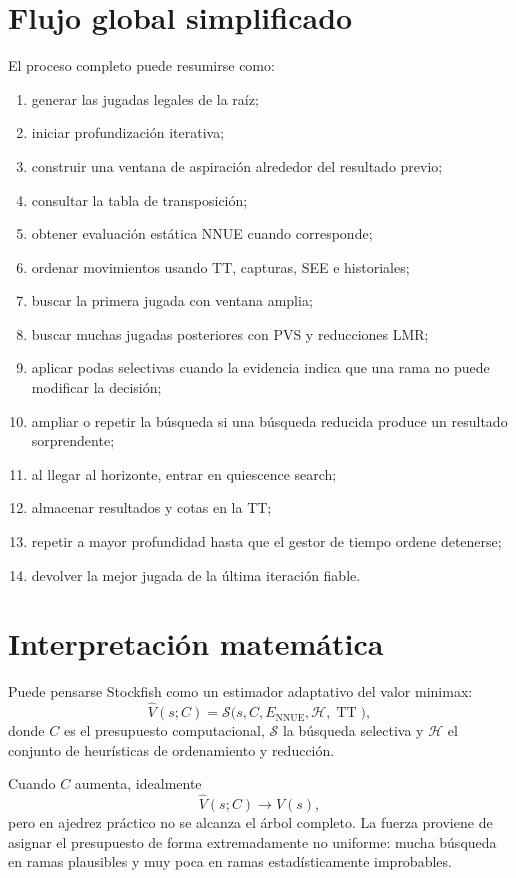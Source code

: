 \documentclass[11pt,a4paper]{article}
\begin{document}
\section{Flujo global simplificado}

El proceso completo puede resumirse como:
\begin{enumerate}
    \item generar las jugadas legales de la raíz;
    \item iniciar profundización iterativa;
    \item construir una ventana de aspiración alrededor del resultado previo;
    \item consultar la tabla de transposición;
    \item obtener evaluación estática NNUE cuando corresponde;
    \item ordenar movimientos usando TT, capturas, SEE e historiales;
    \item buscar la primera jugada con ventana amplia;
    \item buscar muchas jugadas posteriores con PVS y reducciones LMR;
    \item aplicar podas selectivas cuando la evidencia indica que una rama no puede modificar la decisión;
    \item ampliar o repetir la búsqueda si una búsqueda reducida produce un resultado sorprendente;
    \item al llegar al horizonte, entrar en quiescence search;
    \item almacenar resultados y cotas en la TT;
    \item repetir a mayor profundidad hasta que el gestor de tiempo ordene detenerse;
    \item devolver la mejor jugada de la última iteración fiable.
\end{enumerate}

\section{Interpretación matemática}

Puede pensarse Stockfish como un estimador adaptativo del valor minimax:
\[
\widehat V(s;C)=\mathcal S\bigl(s,C,E_{\mathrm{NNUE}},\mathcal H,\operatorname{TT}\bigr),
\]
donde $C$ es el presupuesto computacional, $\mathcal S$ la búsqueda selectiva y $\mathcal H$ el conjunto de heurísticas de ordenamiento y reducción.

Cuando $C$ aumenta, idealmente
\[
\widehat V(s;C) \longrightarrow V(s),
\]
pero en ajedrez práctico no se alcanza el árbol completo. La fuerza proviene de asignar el presupuesto de forma extremadamente no uniforme: mucha búsqueda en ramas plausibles y muy poca en ramas estadísticamente improbables.
\end{document}
